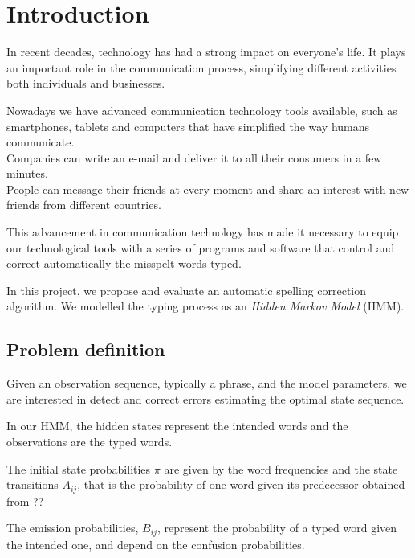 \chapter{Introduction}
\label{chap:Introduction}

In recent decades, technology has had a strong impact on everyone's life.
It plays an important role in the communication process, simplifying 
different activities both individuals and businesses.

Nowadays we have advanced communication technology tools available, 
such as smartphones, tablets and computers that have simplified the way 
humans communicate. \\
Companies can write an e-mail and deliver it to all their consumers in a few 
minutes. \\
People can message their friends at every moment and share an interest 
with new friends from different countries.

This advancement in communication technology has made it necessary to 
equip our technological tools with a series of programs and software that 
control and correct automatically the misspelt words typed.

In this project, we propose and evaluate an automatic spelling correction 
algorithm. 
We modelled the typing process as an \textit{Hidden Markov Model} (HMM). 




\section{Problem definition}
Given an observation sequence, typically a phrase,  and the model 
parameters, we are interested in detect and correct errors estimating the 
optimal state sequence. %

In our HMM, the hidden states represent the intended words and the 
observations are the typed words. 

The initial state probabilities $\pi$ are given by the word frequencies and 
the state transitions $A_{ij}$, that is the probability of one word given 
its predecessor obtained from ?? %

The emission probabilities, $B_{ij}$, represent the probability of a typed 
word given the intended one, and depend on the confusion probabilities.

